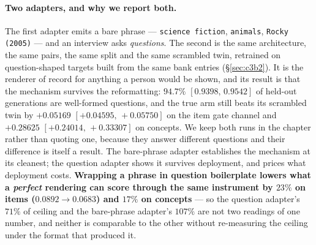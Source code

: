 \documentclass[11pt]{article}
\begin{document}
\paragraph{Two adapters, and why we report both.} The first adapter emits a bare phrase ---
\texttt{science fiction}, \texttt{animals}, \texttt{Rocky (2005)} --- and an interview asks
\emph{questions}. The second is the same architecture, the same pairs, the same split and the same
scrambled twin, retrained on question-shaped targets built from the same bank entries
(\S\ref{sec:c3b2}). It is the renderer of record for anything a person would be shown, and its
result is that the mechanism survives the reformatting: $94.7\%$ $[0.9398,\,0.9542]$ of held-out
generations are well-formed questions, and the true arm still beats its scrambled twin by
$+0.05169$ $[+0.04595,\,+0.05750]$ on the item gate channel and $+0.28625$
$[+0.24014,\,+0.33307]$ on concepts. We keep both runs in the chapter rather than quoting one,
because they answer different questions and their difference is itself a result. The bare-phrase
adapter establishes the mechanism at its cleanest; the question adapter shows it survives
deployment, and prices what deployment costs. \textbf{Wrapping a phrase in question boilerplate
lowers what a \emph{perfect} rendering can score through the same instrument by $23\%$ on items
($0.0892 \to 0.0683$) and $17\%$ on concepts} --- so the question adapter's $71\%$ of ceiling and the
bare-phrase adapter's $107\%$ are not two readings of one number, and neither is comparable to the
other without re-measuring the ceiling under the format that produced it.
\end{document}

